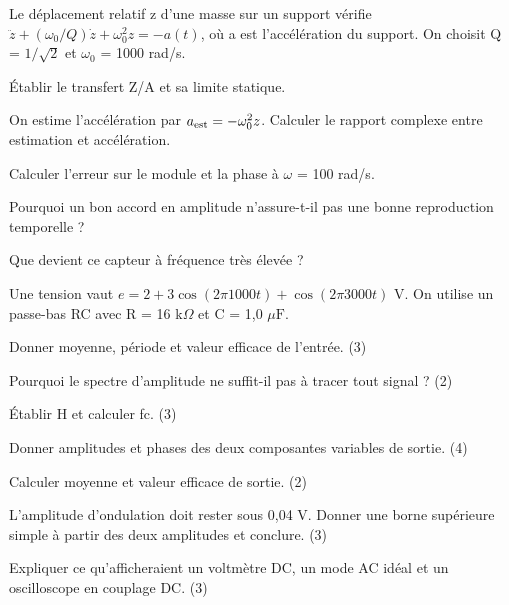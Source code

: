 \label{ch07-ex-D3}
Le déplacement relatif z d’une masse sur un support vérifie $\ddot z+(\omega_0/Q)\dot z+\omega_0^2z=-a(t)$, où a est l’accélération du support. On choisit Q = $1/\sqrt2$ et \ensuremath{\omega_0} = 1000 rad/s.\begin{questions}
\item Établir le transfert Z/A et sa limite statique.
\item On estime l’accélération par $a_{\rm est}=-\omega_0^2z$. Calculer le rapport complexe entre estimation et accélération.
\item Calculer l’erreur sur le module et la phase à \ensuremath{\omega} = 100 rad/s.
\item Pourquoi un bon accord en amplitude n’assure-t-il pas une bonne reproduction temporelle ?
\item Que devient ce capteur à fréquence très élevée ?
\end{questions}


Une tension vaut $e=2+3\cos(2\pi1000t)+\cos(2\pi3000t)$ V. On utilise un passe-bas RC avec R = 16 k$\Omega$ et C = 1,0 $\mu\mathrm F$.
\begin{questions}
\item Donner moyenne, période et valeur efficace de l’entrée. (3)
\item Pourquoi le spectre d’amplitude ne suffit-il pas à tracer tout signal ? (2)
\end{questions}

\begin{questions}
\item Établir H et calculer fc. (3)
\item Donner amplitudes et phases des deux composantes variables de sortie. (4)
\item Calculer moyenne et valeur efficace de sortie. (2)
\end{questions}

\begin{questions}
\item L’amplitude d’ondulation doit rester sous 0,04 V. Donner une borne supérieure simple à partir des deux amplitudes et conclure. (3)
\item Expliquer ce qu’afficheraient un voltmètre DC, un mode AC idéal et un oscilloscope en couplage DC. (3)
\end{questions}



